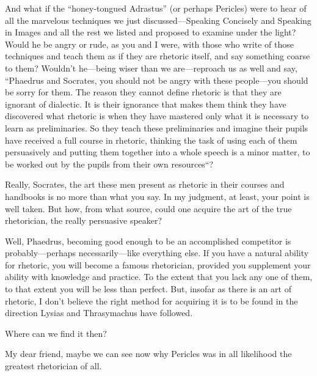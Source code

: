 \saysocrates And what if the “honey-tongued Adrastus” (or perhaps
Pericles) were to hear
of all the marvelous techniques we just discussed---Speaking Concisely
and Speaking in Images and all the rest we listed and proposed
to examine under the light? Would he be angry or rude, as you and I
were, with those who write of those techniques and teach them as if they
are rhetoric itself, and say something coarse to them? Wouldn't
he---being wiser than we are---reproach us as well and say, “Phaedrus
and Socrates, you should not be angry with these people---you should be
sorry for them. The reason they cannot define rhetoric is that they are
ignorant of dialectic. It is their ignorance that makes them think they
have discovered what rhetoric is when they have mastered only what it is necessary to learn as preliminaries. So they teach these
preliminaries and imagine their pupils have received a full course in
rhetoric, thinking the task of using each of them persuasively and
putting them together into a whole speech is a minor matter, to be
worked out by the pupils from their own resources“?

\sayphaedrus Really, Socrates, the art these men present as rhetoric in
their courses and handbooks is no more than what you say. In my
judgment, at least, your point is well taken. But how, from what
source, could one acquire the art of the true rhetorician, the really
persuasive speaker?

\saysocrates Well, Phaedrus, becoming good enough to be an accomplished
competitor is probably---perhaps necessarily---like everything else. If
you have a natural ability for rhetoric, you will become a famous
rhetorician, provided you supplement your ability with knowledge and
practice. To the extent that you lack any one of them, to that extent
you will be less than perfect. But, insofar as there is an art of
rhetoric, I don't believe the right method for acquiring it is to be
found in the direction Lysias and Thrasymachus have followed.

\sayphaedrus Where can we find it then?

\saysocrates My dear friend, maybe we can see now why Pericles was
in all likelihood the greatest rhetorician of all.

